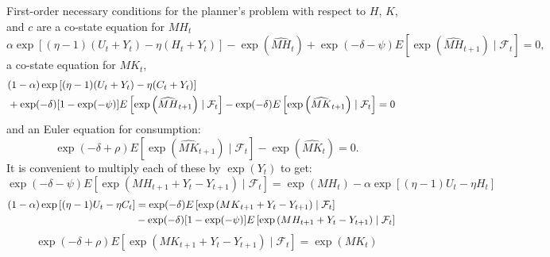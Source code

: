 \documentclass[12pt]{article}
\begin{document}
First-order necessary conditions for the planner's problem with respect to $H$, $K$, and $c$  are a co-state equation for
$MH_t$ 
\[
 \alpha \exp\left[ (\eta - 1) (U_t + Y_t)  - \eta (H_t + Y_t) \right]    - \exp\left(\widehat{MH}_t \right)  + \exp(-\delta - \psi) E\left[ \exp\left(\widehat{MH}_{t+1}  \right)  \mid {\mathcal F}_t \right]
= 0 ,
\]
a co-state equation for $MK_t$,
\begin{align*}
&(1 - \alpha) \exp\left[ (\eta - 1) ( U_t + Y_t)  - \eta (C_t + Y_t) \right] \cr  & + \exp(-\delta) [1 - \exp(-\psi)] E\left[ \exp\left(\widehat{MH}_{t+1}  \right) \mid {\mathcal F}_t \right]  -
 \exp(-\delta) E\left[ \exp\left(\widehat{MK}_{t+1}\right) \mid {\mathcal F}_t \right] = 0
\end{align*}
and an Euler equation for consumption:
\[
\exp(-\delta + \rho) E\left[ \exp\left( \widehat{MK}_{t+1}\right) \mid {\mathcal F}_t \right] -  \exp\left(\widehat{MK}_t\right) = 0.
\]
It is convenient to multiply each of these by $\exp(Y_t)$ to get:
\[
\exp(-\delta - \psi) E\left[ \exp\left( MH_{t+1} + Y_t - Y_{t+1}\right)  \mid {\mathcal F}_t \right]
= \exp\left(MH_t\right)   - \alpha \exp\left[ (\eta - 1) U_t - \eta H_t  \right]
 \]
\begin{align*}
(1 - \alpha) \exp\left[ (\eta - 1)  U_t - \eta C_t \right]
& = \exp(-\delta) E \left[ \exp \left( {MK}_{t+1} + Y_t - Y_{t+1} \right) \mid {\mathcal F}_t \right]
\cr & -  \exp(-\delta) [1 - \exp(-\psi)]E\left[ \exp \left( MH_{t+1}  + Y_t - Y_{t+1} \right) \mid {\mathcal F}_t \right]
\end{align*}
\[
\exp(-\delta + \rho) E\left[\exp \left( {MK}_{t+1} + Y_t - Y_{t+1} \right) \mid {\mathcal F}_t \right] = \exp\left( {MK}_t \right)
\]
\end{document}
